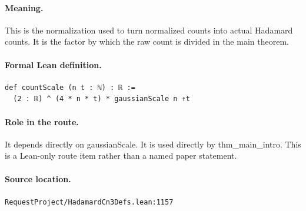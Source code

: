 \medskip
\paragraph{Meaning.}
This is the normalization used to turn normalized counts into actual Hadamard counts. It is the factor by which the raw count is divided in the main theorem.
\paragraph{Formal Lean definition.}
\begin{verbatim}
def countScale (n t : ℕ) : ℝ :=
  (2 : ℝ) ^ (4 * n * t) * gaussianScale n ↑t
\end{verbatim}
\paragraph{Role in the route.}
It depends directly on gaussianScale. It is used directly by thm\_main\_intro. This is a Lean-only route item rather than a named paper statement.
\paragraph{Source location.}
\texttt{RequestProject/HadamardCn3Defs.lean:1157}
\medskip
